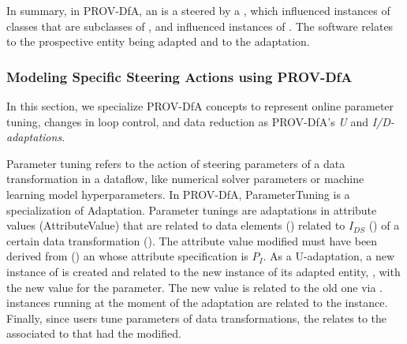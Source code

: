 In summary, in PROV-DfA, an  is a  steered by a , which influenced instances of classes that are subclasses of
, and influenced instances of .
The
 software relates to the prospective entity being adapted and to the adaptation.

\subsubsection{Modeling Specific Steering Actions using PROV-DfA}

In this section, we specialize PROV-DfA concepts to represent online parameter tuning, changes in loop control, and data reduction as PROV-DfA's \textit{U} and \textit{I/D-adaptations}.



Parameter tuning refers to the action of steering parameters of a data transformation in a dataflow, like numerical solver parameters or machine learning model hyperparameters. In PROV-DfA, ParameterTuning is a specialization of Adaptation. Parameter tunings are adaptations in attribute values (AttributeValue) that are related to data elements () related to $I_{DS}$ () of a certain data transformation ().
The attribute value modified must have been derived from ()
an  whose attribute specification is $P_I$.
As a U-adaptation, a new instance of  is created and related to the new instance of its adapted entity, \ie{} , with the new value for the parameter.
The new value is related to the old one via .
 instances running at the moment of the adaptation are related to the  instance.
Finally, since users tune parameters of data transformations, the  relates to the  associated to  that had the  modified.


